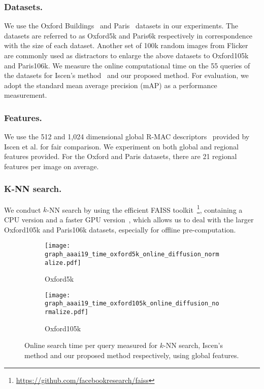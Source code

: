 \documentclass[letterpaper]{article} \usepackage{aaai19}  \usepackage{times}  \usepackage{helvet}  \usepackage{courier}  \usepackage{url}  \usepackage{graphicx}  \frenchspacing  \setlength{\pdfpagewidth}{8.5in}  \setlength{\pdfpageheight}{11in}
\begin{document}
\subsubsection{Datasets.}
We use the Oxford Buildings~\cite{philbin2007object} and Paris~\cite{philbin2008lost} datasets in our experiments.
The datasets are referred to as Oxford5k and Paris6k respectively in correspondence with the size of each dataset.
Another set of 100k random images from Flicker~\cite{philbin2008lost} are commonly used as distractors to enlarge the above datasets to Oxford105k and Paris106k.
We measure the online computational time on the 55 queries of the datasets for Iscen's method~\cite{iscen2017efficient} and our proposed method.
For evaluation, we adopt the standard mean average precision (mAP) as a performance measurement.

\subsubsection{Features.}
We use the 512 and 1,024 dimensional global R-MAC descriptors~\cite{tolias2015particular,gordo2016deep} provided by Iscen et al. for fair comparison.
We experiment on both global and regional features provided.
For the Oxford and Paris datasets, there are 21 regional features per image on average.  


\subsubsection{K-NN search.}
We conduct $k$-NN search by using the efficient FAISS toolkit~\footnote{\url{https://github.com/facebookresearch/faiss}}, containing a CPU version and a faster GPU version~\cite{johnson2017billion}, which allows us to deal with the larger Oxford105k and Paris106k datasets, especially for offline pre-computation.

\begin{figure}[t]
  \centering
  \begin{subfigure}[b]{\linewidth}
    \texttt{[image: graph\_aaai19\_time\_oxford5k\_online\_diffusion\_normalize.pdf]}
    \caption{Oxford5k}
  \end{subfigure}
  \begin{subfigure}[b]{\linewidth}
    \texttt{[image: graph\_aaai19\_time\_oxford105k\_online\_diffusion\_normalize.pdf]}
    \caption{Oxford105k}
  \end{subfigure}
  \caption{Online search time per query measured for $k$-NN search, Iscen's method and our proposed method respectively, using global features.}
  \label{fig:time}
\vspace{-3mm}
\end{figure}
\end{document}
